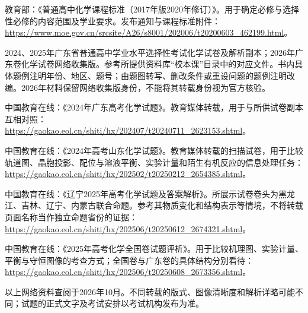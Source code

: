 \documentclass[UTF8,a4paper,zihao=5,oneside,openany,fontset=none]{ctexbook}
\begin{document}
\begin{enumerate}[label={[\arabic*]},leftmargin=2em,itemsep=0.5em]
\item 教育部：《普通高中化学课程标准（2017年版2020年修订）》。用于确定必修与选择性必修的内容范围及学业要求。发布通知与课程标准附件：\\
\url{https://www.moe.gov.cn/srcsite/A26/s8001/202006/t20200603_462199.html}。

\item 2024、2025年广东省普通高中学业水平选择性考试化学试卷及解析副本；2026年广东卷化学试卷网络收集版。参考所提供资料库“校本课”目录中的对应文件。书内具体题例注明年份、地区、题号；由题图转写、删改条件或重设问题的题例注明改编。2026年材料保留网络收集版身份，不能将其转载身份视为官方核验。

\item 中国教育在线：《2024年广东高考化学试题》。教育媒体转载，用于与所供试卷副本互相对照：\\
\url{https://gaokao.eol.cn/shiti/hx/202407/t20240711_2623153.shtml}。

\item 中国教育在线：《2024年高考山东化学试题》。教育媒体转载的扫描试卷，用于比较轨道图、晶胞投影、配位与溶液平衡、实验计量和陌生有机反应的信息处理任务：\\
\url{https://gaokao.eol.cn/shiti/hx/202502/t20250212_2654385.shtml}。

\item 中国教育在线：《辽宁2025年高考化学试题及答案解析》。所展示试卷卷头为黑龙江、吉林、辽宁、内蒙古联合命题。参考其物质变化和结构表示等情境，不将转载页面名称当作独立命题省份的证据：\\
\url{https://gaokao.eol.cn/shiti/hx/202506/t20250612_2674321.shtml}。

\item 中国教育在线：《2025年高考化学全国卷试题评析》。用于比较机理图、实验计量、平衡与守恒图像的考查方式；全国卷与广东卷的具体结构分别看待：\\
\url{https://gaokao.eol.cn/shiti/hx/202506/t20250608_2673356.shtml}。
\end{enumerate}

\noindent 以上网络资料查阅于2026年10月。不同转载的版式、图像清晰度和解析详略可能不同；试题的正式文字及考试安排以考试机构发布为准。
\end{document}
